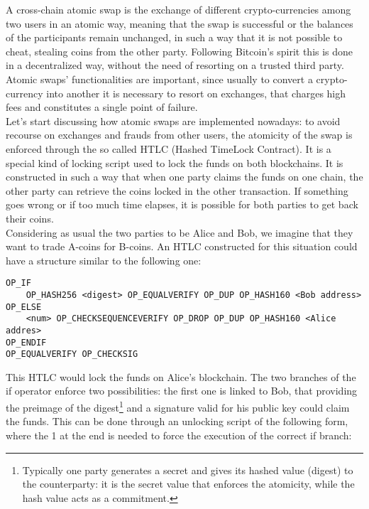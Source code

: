 \bigskip
\noindent
A cross-chain atomic swap is the exchange of different crypto-currencies among two users in an atomic way, meaning that the swap is successful or the balances of the participants remain unchanged, in such a way that it is not possible to cheat, stealing coins from the other party. Following Bitcoin's spirit this is done in a decentralized way, without the need of resorting on a trusted third party. Atomic swaps' functionalities are important, since usually to convert a crypto-currency into another it is necessary to resort on exchanges, that charges high fees and constitutes a single point of failure.
\\
Let's start discussing how atomic swaps are implemented nowadays: to avoid recourse on exchanges and frauds from other users, the atomicity of the swap is enforced through the so called HTLC (Hashed TimeLock Contract). It is a special kind of locking script used to lock the funds on both blockchains. It is constructed in such a way that when one party claims the funds on one chain, the other party can retrieve the coins locked in the other transaction. If something goes wrong or if too much time elapses, it is possible for both parties to get back their coins.
\\
Considering as usual the two parties to be Alice and Bob, we imagine that they want to trade A-coins for B-coins. An HTLC constructed for this situation could have a structure similar to the following one:

\bigskip

\begin{lstlisting}[frame=single]
OP_IF 
	OP_HASH256 <digest> OP_EQUALVERIFY OP_DUP OP_HASH160 <Bob address>
OP_ELSE
	<num> OP_CHECKSEQUENCEVERIFY OP_DROP OP_DUP OP_HASH160 <Alice addres>
OP_ENDIF
OP_EQUALVERIFY OP_CHECKSIG
\end{lstlisting}

\bigskip
\noindent
This HTLC would lock the funds on Alice's blockchain. The two branches of the if operator enforce two possibilities: the first one is linked to Bob, that providing the preimage of the digest\footnote{Typically one party generates a secret and gives its hashed value (digest) to the counterparty: it is the secret value that enforces the atomicity, while the hash value acts as a commitment.} and a signature valid for his public key could claim the funds. This can be done through an unlocking script of the following form, where the 1 at the end is needed to force the execution of the correct if branch:

